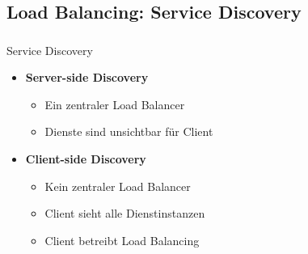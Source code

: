 \subsection{Load Balancing: Service Discovery}
\begin{frame}
	\frametitle{\insertsection}
    \framesubtitle{\insertsubsection}
    \begin{block}{Service Discovery}
	\begin{itemize}
		\item \textbf{Server-side Discovery}
		\begin{itemize}
			\item Ein zentraler Load Balancer
			\item Dienste sind unsichtbar für Client
		\end{itemize}
			\item \textbf{Client-side Discovery}
		\begin{itemize}
			\item Kein zentraler Load Balancer
			\item Client sieht alle Dienstinstanzen
			\item Client betreibt Load Balancing
		\end{itemize}
	\end{itemize}
    \end{block}
\end{frame}

